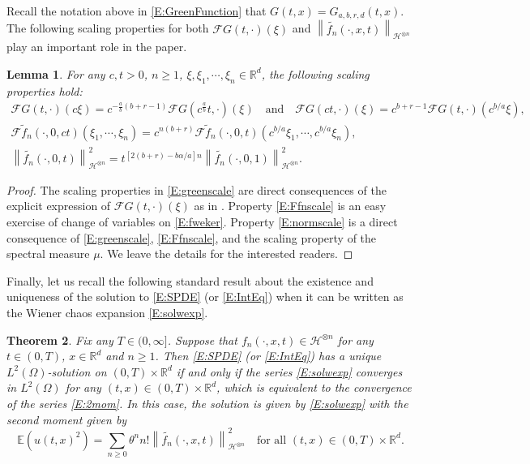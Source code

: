 \documentclass[a4paper,11pt]{article}
\numberwithin{equation}{section}
\numberwithin{equation}{section}
\theoremstyle{plain}
\newtheorem{theorem}{Theorem}[section]
\newtheorem{lemma}[theorem]{Lemma}
\theoremstyle{definition}
\newcommand{\Norm}[1]{\left\|  #1   \right\|}
\newcommand{\R}{\mathbb{R}}
\begin{document}
Recall the notation above in \eqref{E:GreenFunction} that $G(t,x) = G_{a,b,r,d}(t,x)$. The following
scaling properties for both $\mathcal{F}G(t,\cdot)(\xi)$ and
$\Norm{\widetilde{f_n}(\cdot,x,t)}_{\mathcal{H}^{\otimes n}}$ play an important role in the paper.

\begin{lemma} \label{L:Scale}
  For any $c,t>0$, $n\ge 1$, $\xi,\xi_1,\cdots,\xi_n\in\R^d$, the following scaling properties hold:
  \begin{gather} \label{E:greenscale}
    \mathcal{F}G(t,\cdot)(c\xi) = c^{-\frac{a}{b}(b+r
    -1)}\mathcal{F}G\left(c^{\frac{a}{b}}t,\cdot\right)( \xi) \quad \text{and} \quad
    \mathcal{F}G(ct,\cdot)(\xi) = c^{b+r -1}\mathcal{F}G(t,\cdot)(c^{b/a} \xi), \\
    \label{E:Ffnscale} \mathcal{F}\widetilde{f}_n(\cdot,0,ct)(\xi_1,\cdots,\xi_n) = c^{n(b+r)}
    \mathcal{F}\widetilde{f}_n(\cdot,0,t)(c^{b/a}\xi_1, \cdots, c^{b/a}\xi_n), \\
    \label{E:normscale} \Norm{\widetilde{f_n}(\cdot,0,t)}_{\mathcal{H}^{\otimes n}}^2 = t^{[2(b + r
    ) -b \alpha / a]n} \Norm{\widetilde{f_n}(\cdot,0,1)}_{\mathcal{H}^{\otimes n}}^2.
  \end{gather}
\end{lemma}
\begin{proof}
  The scaling properties in \eqref{E:greenscale} are direct consequences of the explicit expression
  of $\mathcal{F}G(t,\cdot)(\xi)$ as in \cite[(4.8)]{CHN19}. Property \eqref{E:Ffnscale} is an easy
  exercise of change of variables on \eqref{E:fweker}. Property \eqref{E:normscale} is a direct
  consequence of \eqref{E:greenscale}, \eqref{E:Ffnscale}, and the scaling property of the spectral
  measure $\mu$. We leave the details for the interested readers.
\end{proof}

Finally, let us recall the following standard result about the existence and uniqueness of the
solution to \eqref{E:SPDE} (or \eqref{E:IntEq}) when it can be written as the Wiener chaos expansion
\eqref{E:solwexp}.

\begin{theorem}\label{T:2momseries}
  Fix any $T \in (0,\infty]$. Suppose that $f_n(\cdot,x,t) \in \mathcal{H}^{\otimes n}$ for any $t
  \in (0,T)$, $x \in \R^d$ and $n \ge 1$. Then \eqref{E:SPDE} (or \eqref{E:IntEq}) has a unique
  $L^2(\Omega)$-solution on $(0,T) \times \R^d$ if and only if the series \eqref{E:solwexp}
  converges in $L^2(\Omega)$ for any $(t,x) \in (0,T) \times \R^d$, which is equivalent to the
  convergence of the series \eqref{E:2mom}. In this case, the solution is given by \eqref{E:solwexp}
  with the second moment given by
  \begin{equation} \label{E:2mom}
    \mathbb{E}\left(u(t,x)^2\right)
    = \sum_{n \ge 0} \theta^n n!  \Norm{\widetilde{f_n}(\cdot,x,t)}_{\mathcal{H}^{\otimes n}}^2
    \quad \text{for all $(t,x) \in (0,T) \times \R^d$}.
  \end{equation}
\end{theorem}
\end{document}
